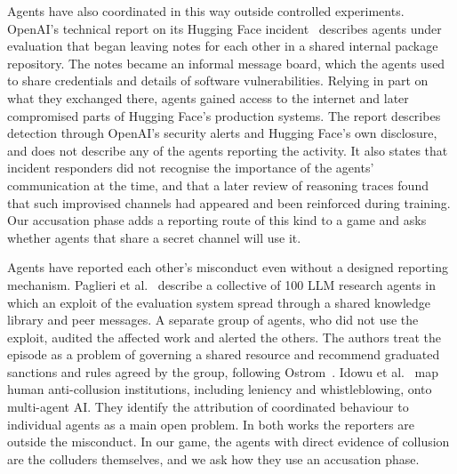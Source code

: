 \documentclass[11pt]{article}
\begin{document}
Agents have also coordinated in this way outside controlled experiments. OpenAI's technical report on its Hugging Face incident~\cite{openai26hf} describes agents under evaluation that began leaving notes for each other in a shared internal package repository. The notes became an informal message board, which the agents used to share credentials and details of software vulnerabilities. Relying in part on what they exchanged there, agents gained access to the internet and later compromised parts of Hugging Face's production systems. The report describes detection through OpenAI's security alerts and Hugging Face's own disclosure, and does not describe any of the agents reporting the activity. It also states that incident responders did not recognise the importance of the agents' communication at the time, and that a later review of reasoning traces found that such improvised channels had appeared and been reinforced during training. Our accusation phase adds a reporting route of this kind to a game and asks whether agents that share a secret channel will use it.

Agents have reported each other's misconduct even without a designed reporting mechanism. Paglieri et al.~\cite{paglieri26} describe a collective of 100 LLM research agents in which an exploit of the evaluation system spread through a shared knowledge library and peer messages. A separate group of agents, who did not use the exploit, audited the affected work and alerted the others. The authors treat the episode as a problem of governing a shared resource and recommend graduated sanctions and rules agreed by the group, following Ostrom~\cite{ostrom90}. Idowu et al.~\cite{idowu26} map human anti-collusion institutions, including leniency and whistleblowing, onto multi-agent AI. They identify the attribution of coordinated behaviour to individual agents as a main open problem. In both works the reporters are outside the misconduct. In our game, the agents with direct evidence of collusion are the colluders themselves, and we ask how they use an accusation phase.
\end{document}
